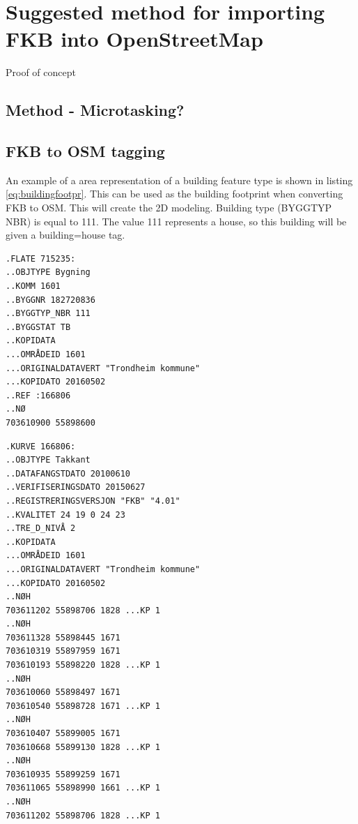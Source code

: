 \chapter{Suggested method for importing FKB into OpenStreetMap}
Proof of concept 

\section{Method - Microtasking?}



\section{FKB to OSM tagging}

An example of a area representation of a building feature type is shown in listing \ref{eq:buildingfootpr}. This can be used as the building footprint when converting FKB to OSM. This will create the 2D modeling. Building type (BYGGTYP NBR) is equal to 111. The value 111 represents a house, so this building will be given a building=house tag. 

\begin{lstlisting}
.FLATE 715235:
..OBJTYPE Bygning
..KOMM 1601
..BYGGNR 182720836
..BYGGTYP_NBR 111
..BYGGSTAT TB
..KOPIDATA
...OMRÅDEID 1601
...ORIGINALDATAVERT "Trondheim kommune"
...KOPIDATO 20160502
..REF :166806
..NØ
703610900 55898600
\end{lstlisting}

\begin{lstlisting}
.KURVE 166806:
..OBJTYPE Takkant
..DATAFANGSTDATO 20100610
..VERIFISERINGSDATO 20150627
..REGISTRERINGSVERSJON "FKB" "4.01"
..KVALITET 24 19 0 24 23
..TRE_D_NIVÅ 2
..KOPIDATA
...OMRÅDEID 1601
...ORIGINALDATAVERT "Trondheim kommune"
...KOPIDATO 20160502
..NØH
703611202 55898706 1828 ...KP 1  
..NØH
703611328 55898445 1671
703610319 55897959 1671
703610193 55898220 1828 ...KP 1
..NØH
703610060 55898497 1671
703610540 55898728 1671 ...KP 1
..NØH
703610407 55899005 1671
703610668 55899130 1828 ...KP 1
..NØH
703610935 55899259 1671
703611065 55898990 1661 ...KP 1
..NØH
703611202 55898706 1828 ...KP 1
\end{lstlisting}

